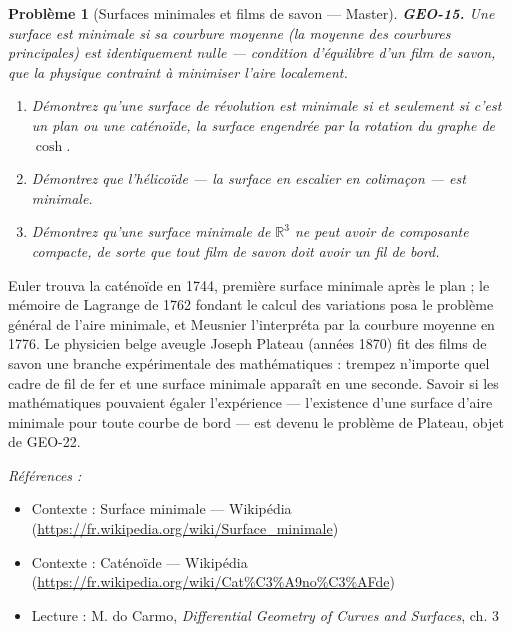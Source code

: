 \documentclass[11pt]{article}
\newtheorem{problem}{Problème}
\newenvironment{refs}{\par\small\noindent\emph{Références :}\begin{itemize}\setlength\itemsep{0pt}}{\end{itemize}\normalsize}
\begin{document}
\begin{problem}[{Surfaces minimales et films de savon --- Master}]
\textbf{GEO-15.} Une surface est minimale si sa courbure moyenne (la moyenne des courbures
principales) est identiquement nulle --- condition d'équilibre d'un film de savon, que la physique
contraint à minimiser l'aire localement.
\begin{enumerate}
\item[(a)] Démontrez qu'une surface de révolution est minimale si et seulement si c'est un plan ou une
caténoïde, la surface engendrée par la rotation du graphe de $ \cosh $.
\item[(b)] Démontrez que l'hélicoïde --- la surface en escalier en colimaçon --- est minimale.
\item[(c)] Démontrez qu'une surface minimale de $ \mathbb{R}^3 $ ne peut avoir de composante compacte,
de sorte que tout film de savon doit avoir un fil de bord.
\end{enumerate}

\end{problem}

\noindent Euler trouva la caténoïde en 1744, première surface minimale après le plan ; le
mémoire de Lagrange de 1762 fondant le calcul des variations posa le problème général de l'aire
minimale, et Meusnier l'interpréta par la courbure moyenne en 1776. Le physicien belge aveugle
Joseph Plateau (années 1870) fit des films de savon une branche expérimentale des mathématiques :
trempez n'importe quel cadre de fil de fer et une surface minimale apparaît en une seconde. Savoir
si les mathématiques pouvaient égaler l'expérience --- l'existence d'une surface d'aire minimale pour
toute courbe de bord --- est devenu le problème de Plateau, objet de GEO-22.

\begin{refs}
\item Contexte : Surface minimale --- Wikipédia (\url{https://fr.wikipedia.org/wiki/Surface_minimale})
\item Contexte : Caténoïde --- Wikipédia (\url{https://fr.wikipedia.org/wiki/Cat%C3%A9no%C3%AFde})
\item Lecture : M. do Carmo, \textit{Differential Geometry of Curves and Surfaces}, ch. 3
\end{refs}

\bigskip
\end{document}
